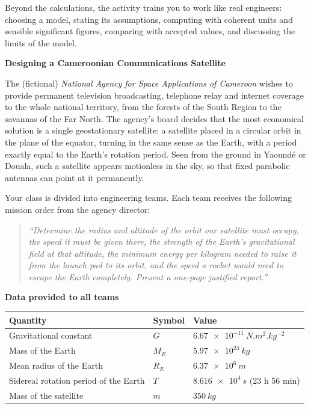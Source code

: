 \documentclass[11pt]{article}
\newcommand{\cle}[1]{{\popxbold\color{popdark}#1}}
\newcounter{popsec}
\newcounter{popsub}
\newcommand{\courssub}[1]{%
  \stepcounter{popsub}%
  \par\vspace{9pt}\noindent{\popxbold\fontsize{11.5}{13}\selectfont\color{popink}{\color{poporange}\thepopsec.\thepopsub}\hspace{6pt}#1}\par\nopagebreak\vspace{4pt}
}
\begin{document}
Beyond the calculations, the activity trains you to work like real engineers: choosing a model, stating its assumptions, computing with coherent units and sensible significant figures, comparing with accepted values, and discussing the limits of the model.

\courssub{Situation}

\textbf{Designing a Cameroonian Communications Satellite}\par

The (fictional) \emph{National Agency for Space Applications of Cameroon} wishes to provide permanent television broadcasting, telephone relay and internet coverage to the whole national territory, from the forests of the South Region to the savannas of the Far North. The agency's board decides that the most economical solution is a single \cle{geostationary} satellite: a satellite placed in a circular orbit in the plane of the equator, turning in the same sense as the Earth, with a period exactly equal to the Earth's rotation period. Seen from the ground in Yaoundé or Douala, such a satellite appears motionless in the sky, so that fixed parabolic antennas can point at it permanently.

Your class is divided into engineering teams. Each team receives the following mission order from the agency director:

\begin{quote}
\emph{``Determine the radius and altitude of the orbit our satellite must occupy, the speed it must be given there, the strength of the Earth's gravitational field at that altitude, the minimum energy per kilogram needed to raise it from the launch pad to its orbit, and the speed a rocket would need to escape the Earth completely. Present a one-page justified report.''}
\end{quote}

\textbf{Data provided to all teams}

\begin{center}
\begin{tabularx}{\linewidth}{|l|X|l|}
\hline
\rowcolor{popblueL} \textbf{Quantity} & \textbf{Symbol} & \textbf{Value} \\
\hline
Gravitational constant & $G$ & $\SI{6.67e-11}{N.m^{2}.kg^{-2}}$ \\
\hline
Mass of the Earth & $M_{E}$ & $\SI{5.97e24}{kg}$ \\
\hline
Mean radius of the Earth & $R_{E}$ & $\SI{6.37e6}{m}$ \\
\hline
Sidereal rotation period of the Earth & $T$ & $\SI{8.616e4}{s}$ (23 h 56 min) \\
\hline
Mass of the satellite & $m$ & $\SI{350}{kg}$ \\
\hline
\end{tabularx}
\end{center}
\end{document}
